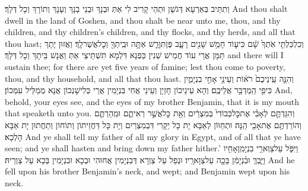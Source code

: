 {וְתִתֵּיב בְּאַרְעָא דְּגֹשֶׁן וּתְהֵי קָרִיב לִי אַתְּ וּבְנָךְ וּבְנֵי בְנָךְ וְעָנָךְ וְתוֹרָךְ וְכָל דְּלָךְ׃}
{And thou shalt dwell in the land of Goshen, and thou shalt be near unto me, thou, and thy children, and thy children’s children, and thy flocks, and thy herds, and all that thou hast;}{}
{וְכִלְכַּלְתִּ֤י אֹֽתְךָ֙ שָׁ֔ם כִּי\maqqaf ע֛וֹד חָמֵ֥שׁ שָׁנִ֖ים רָעָ֑ב פֶּן\maqqaf תִּוָּרֵ֛שׁ אַתָּ֥ה וּבֵֽיתְךָ֖ וְכׇל\maqqaf אֲשֶׁר\maqqaf לָֽךְ׃}
{וַאֲזוּן יָתָךְ תַּמָּן אֲרֵי עוֹד חֲמֵישׁ שְׁנִין כַּפְנָא דִּלְמָא תִּשְׁתֵּיצֵי אַתְּ וַאֲנָשׁ בֵּיתָךְ וְכָל דְּלָךְ׃}
{and there will I sustain thee; for there are yet five years of famine; lest thou come to poverty, thou, and thy household, and all that thou hast.}{}
{וְהִנֵּ֤ה עֵֽינֵיכֶם֙ רֹא֔וֹת וְעֵינֵ֖י אָחִ֣י בִנְיָמִ֑ין כִּי\maqqaf פִ֖י הַֽמְדַבֵּ֥ר אֲלֵיכֶֽם׃}
{וְהָא עֵינֵיכוֹן חָזְיָן וְעֵינֵי אֲחִי בִּנְיָמִין אֲרֵי כְּלִישָׁנְכוֹן אֲנָא מְמַלֵּיל עִמְּכוֹן׃}
{And, behold, your eyes see, and the eyes of my brother Benjamin, that it is my mouth that speaketh unto you.}{}
{וְהִגַּדְתֶּ֣ם לְאָבִ֗י אֶת\maqqaf כׇּל\maqqaf כְּבוֹדִי֙ בְּמִצְרַ֔יִם וְאֵ֖ת כׇּל\maqqaf אֲשֶׁ֣ר רְאִיתֶ֑ם וּמִֽהַרְתֶּ֛ם וְהוֹרַדְתֶּ֥ם אֶת\maqqaf אָבִ֖י הֵֽנָּה׃}
{וּתְחַוּוֹן לְאַבָּא יָת כָּל יְקָרִי דִּבְמִצְרַיִם וְיָת כָּל דַּחֲזֵיתוֹן וְתוֹחוֹן וְתַחֲתוּן יָת אַבָּא הָלְכָא׃}
{And ye shall tell my father of all my glory in Egypt, and of all that ye have seen; and ye shall hasten and bring down my father hither.’}{}
{וַיִּפֹּ֛ל עַל\maqqaf צַוְּארֵ֥י בִנְיָמִֽן\maqqaf אָחִ֖יו וַיֵּ֑בְךְּ וּבִ֨נְיָמִ֔ן בָּכָ֖ה עַל\maqqaf צַוָּארָֽיו׃}
{וּנְפַל עַל צַוְרָא דְּבִנְיָמִין אֲחוּהִי וּבְכָא וּבִנְיָמִין בְּכָא עַל צַוְרֵיהּ׃}
{And he fell upon his brother Benjamin’s neck, and wept; and Benjamin wept upon his neck.}{}
